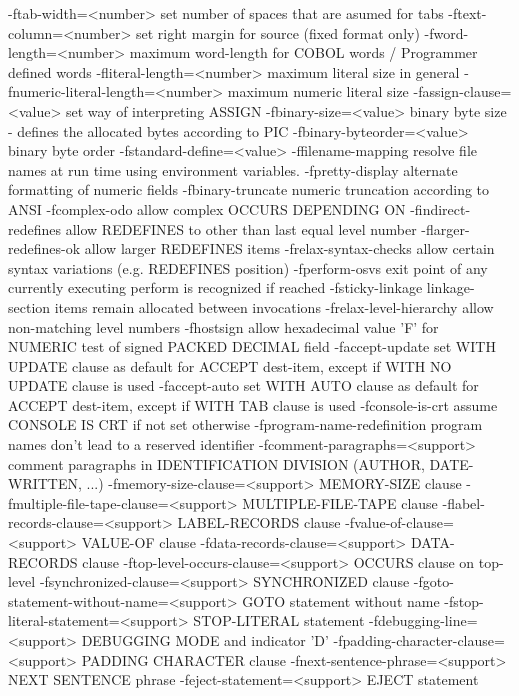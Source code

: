   -ftab-width=<number>  set number of spaces that are asumed for tabs
  -ftext-column=<number> set right margin for source (fixed format only)
  -fword-length=<number> maximum word-length for COBOL words / Programmer defined words
  -fliteral-length=<number> maximum literal size in general
  -fnumeric-literal-length=<number> maximum numeric literal size
  -fassign-clause=<value> set way of interpreting ASSIGN
  -fbinary-size=<value> binary byte size - defines the allocated bytes according to PIC
  -fbinary-byteorder=<value> binary byte order
  -fstandard-define=<value> 
  -ffilename-mapping    resolve file names at run time using environment variables.
  -fpretty-display      alternate formatting of numeric fields
  -fbinary-truncate     numeric truncation according to ANSI
  -fcomplex-odo         allow complex OCCURS DEPENDING ON
  -findirect-redefines  allow REDEFINES to other than last equal level number
  -flarger-redefines-ok allow larger REDEFINES items
  -frelax-syntax-checks allow certain syntax variations (e.g. REDEFINES position)
  -fperform-osvs        exit point of any currently executing perform is recognized if reached
  -fsticky-linkage      linkage-section items remain allocated between invocations
  -frelax-level-hierarchy allow non-matching level numbers
  -fhostsign            allow hexadecimal value 'F' for NUMERIC test of signed PACKED DECIMAL field
  -faccept-update       set WITH UPDATE clause as default for ACCEPT dest-item, except if WITH NO UPDATE clause is used
  -faccept-auto         set WITH AUTO clause as default for ACCEPT dest-item, except if WITH TAB clause is used
  -fconsole-is-crt      assume CONSOLE IS CRT if not set otherwise
  -fprogram-name-redefinition program names don't lead to a reserved identifier
  -fcomment-paragraphs=<support> comment paragraphs in IDENTIFICATION DIVISION (AUTHOR, DATE-WRITTEN, ...)
  -fmemory-size-clause=<support> MEMORY-SIZE clause
  -fmultiple-file-tape-clause=<support> MULTIPLE-FILE-TAPE clause
  -flabel-records-clause=<support> LABEL-RECORDS clause
  -fvalue-of-clause=<support> VALUE-OF clause
  -fdata-records-clause=<support> DATA-RECORDS clause
  -ftop-level-occurs-clause=<support> OCCURS clause on top-level
  -fsynchronized-clause=<support> SYNCHRONIZED clause
  -fgoto-statement-without-name=<support> GOTO statement without name
  -fstop-literal-statement=<support> STOP-LITERAL statement
  -fdebugging-line=<support> DEBUGGING MODE and indicator 'D'
  -fpadding-character-clause=<support> PADDING CHARACTER clause
  -fnext-sentence-phrase=<support> NEXT SENTENCE phrase
  -feject-statement=<support> EJECT statement
